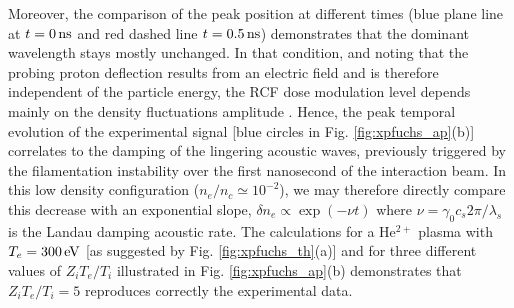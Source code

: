 \documentclass[
 reprint,
 amsmath,amssymb,
 aps,
]{revtex4-1}
\begin{document}
Moreover, the comparison of the peak position at different times (blue plane line at $t=0\,\rm ns$ and red dashed line $t=0.5\,\rm ns$) demonstrates that the dominant wavelength stays mostly unchanged.  In that condition, and noting that the probing proton deflection results from an electric field and is therefore independent of the particle energy, the RCF dose modulation level depends mainly on the density fluctuations amplitude \cite[]{RSI_protograhyb}.
Hence, the peak temporal evolution of the experimental signal [blue circles in Fig. \ref{fig:xpfuchs_ap}(b)] correlates to the damping of the lingering acoustic waves, previously triggered by the filamentation instability over the first nanosecond of  the interaction beam.
In this low density configuration ($n_e/n_c\simeq10^{-2}$), 
we may therefore directly compare this decrease with an exponential slope, $\delta n_e \propto \exp(-\nu t)$ where $\nu = \gamma_0 c_s 2\pi/\lambda_s$ is the Landau damping acoustic rate. The calculations for a He$^{2+}$ plasma with $T_e=300\, \rm eV$ [as suggested by  Fig. \ref{fig:xpfuchs_th}(a)] and  for three different values of $Z_iT_e/T_i$ illustrated in  Fig. \ref{fig:xpfuchs_ap}(b) demonstrates that $Z_iT_e/T_i=5$ reproduces correctly the experimental data. 


\end{document}
